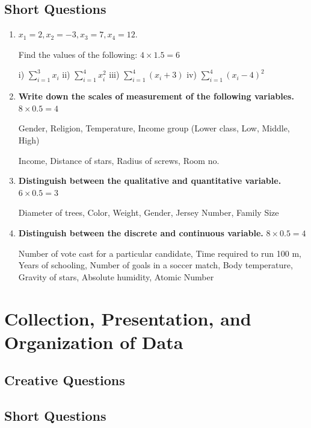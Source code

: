 \documentclass[a4paper,oneside]{book}
\begin{document}
\section{Short Questions}
\begin{enumerate}
    \item
	$x_1=2, x_2=-3, x_3=7, x_4=12.$ 
	
	Find the values of the following: \hfill $4 \times 1.5 = 6$
	
	i) $\displaystyle \sum_{i=1}^3 x_i$ 
	ii) $\displaystyle \sum_{i=1}^4 x_i^2$
	iii) $\displaystyle \sum_{i=1}^4 (x_i+3)$
	iv) $\displaystyle \sum_{i=1}^4 (x_i-4)^2$
	
	
	\item \textbf{Write down the scales of measurement of the following variables.} \hfill $8 \times 0.5 = 4$

	Gender, Religion, Temperature, Income group (Lower class, Low, Middle, High)
	
Income, Distance of stars, Radius of screws, Room no.

\item \textbf{Distinguish between the qualitative and quantitative variable.} \hfill $6 \times 0.5 = 3$

Diameter of trees, Color, Weight, Gender, Jersey Number, Family Size

\item \textbf{Distinguish between the discrete and continuous variable.} \hfill $8 \times 0.5 = 4$

Number of vote cast for a particular candidate, Time required to run 100 m, Years of schooling, Number of goals in a soccer match, Body temperature, Gravity of stars, Absolute humidity, Atomic Number

\end{enumerate}

\chapter{Collection, Presentation, and Organization of Data} 

\section{Creative Questions}

  
\section{Short Questions}
\end{document}

